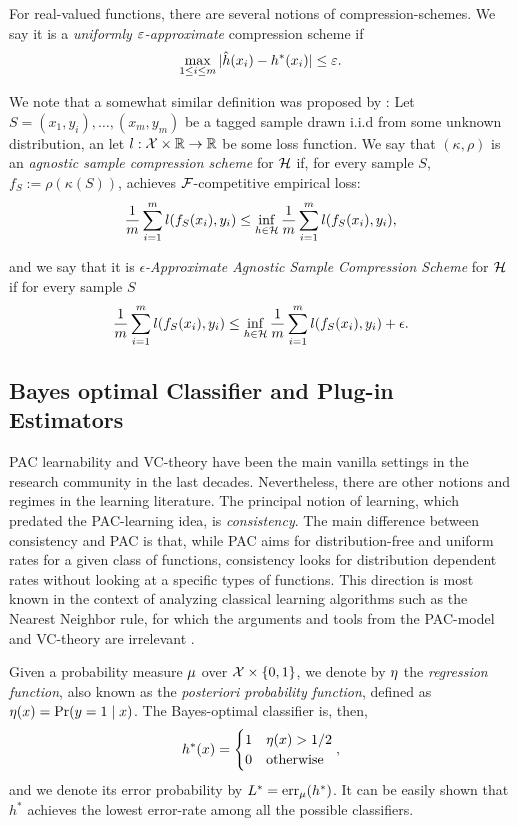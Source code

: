 \documentclass[12pt,a4paper,oneside,onecolumn]{book}
\begin{document}
For real-valued functions,
there are several notions of compression-schemes.
We say it is a \emph{uniformly $\varepsilon$-approximate} compression scheme if 
\[
\max_{1 \leq i \leq m} | \hat{h}(x_i) - h^*(x_i) | \leq \varepsilon.
\]

We note that a somewhat similar definition was proposed by \cite{david2016supervised}: 
Let $S = (x_1,y_i),\ldots,(x_m,y_m)$ be a tagged sample drawn i.i.d from some unknown distribution,
an let $l : \mathcal{X} \times \mathbb{R} \to \mathbb{R}$ be some loss function.
We say that $(\kappa,\rho)$
is an \emph{agnostic sample compression scheme} 
for $\mathcal{H}$ if,
for every sample $S$,
$f_S := \rho(\kappa(S))$,
achieves $\mathcal{F}$-competitive empirical loss:
\[ 
\frac{1}{m}\sum_{i=1}^{m} l(f_S (x_i), y_i) \leq 
\inf_{h\in\mathcal{H}} \frac{1}{m}\sum_{i=1}^{m} l(f_S (x_i), y_i),
\] 

and we say that it is 
\emph{$\epsilon$-Approximate Agnostic Sample Compression Scheme} for $\mathcal{H}$
if for every sample $S$
\[ 
\frac{1}{m}\sum_{i=1}^{m} l(f_S (x_i), y_i) \leq 
\inf_{h\in\mathcal{H}} \frac{1}{m}\sum_{i=1}^{m} l(f_S (x_i), y_i) + \epsilon.
\] 

\subsection{Bayes optimal Classifier and Plug-in Estimators}

PAC learnability and VC-theory have been the main vanilla settings in the research community in the last decades. Nevertheless, there are other notions and regimes in the learning literature. 
The principal notion of learning, which predated the PAC-learning idea, is \emph{consistency}. The main difference between consistency and PAC is that, while PAC aims for distribution-free and uniform rates for a given class of functions, consistency looks for distribution dependent rates without looking at a specific types of functions.
This direction is most known in the context of analyzing classical learning algorithms such as the Nearest Neighbor rule, for which the arguments and tools from the PAC-model and VC-theory are irrelevant  \citep{devroye1985nonparametric, 1053964, DBLP:journals/corr/GottliebKK13}.

Given a probability measure $\mu$ over $\mathcal{X} \times \{0,1\}$, we denote by $\eta$ the {\em regression function}, also known as the {\em posteriori probability function}, 
defined as
$\eta(x) = \Pr(y=1\mid x)$.
The Bayes-optimal classifier is, then,
\[
h^*(x) = \begin{cases}
  1  & \eta(x) > 1/2 \\
  0 & \text{otherwise}
\end{cases},
\]
and we denote its error probability by 
$L^* = \operatorname{err}_\mu(h^*)$.
It can be easily shown that $h^*$ achieves the lowest error-rate among all the possible classifiers. 
\end{document}
